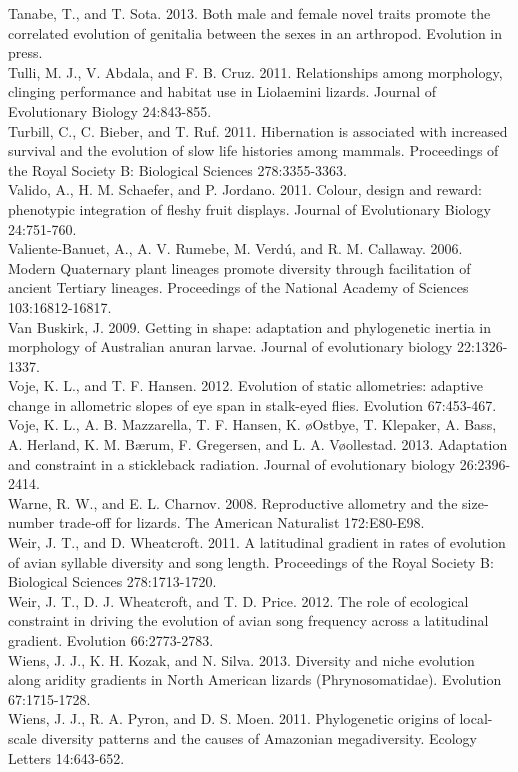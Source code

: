 Tanabe, T., and T. Sota. 2013. Both male and female novel traits promote the correlated evolution of genitalia between the sexes in an arthropod. Evolution in press.\\
Tulli, M. J., V. Abdala, and F. B. Cruz. 2011. Relationships among morphology, clinging performance and habitat use in Liolaemini lizards. Journal of Evolutionary Biology 24:843-855.\\
Turbill, C., C. Bieber, and T. Ruf. 2011. Hibernation is associated with increased survival and the evolution of slow life histories among mammals. Proceedings of the Royal Society B: Biological Sciences 278:3355-3363.\\
Valido, A., H. M. Schaefer, and P. Jordano. 2011. Colour, design and reward: phenotypic integration of fleshy fruit displays. Journal of Evolutionary Biology 24:751-760.\\
Valiente-Banuet, A., A. V. Rumebe, M. Verdú, and R. M. Callaway. 2006. Modern Quaternary plant lineages promote diversity through facilitation of ancient Tertiary lineages. Proceedings of the National Academy of Sciences 103:16812-16817.\\
Van Buskirk, J. 2009. Getting in shape: adaptation and phylogenetic inertia in morphology of Australian anuran larvae. Journal of evolutionary biology 22:1326-1337.\\
Voje, K. L., and T. F. Hansen. 2012. Evolution of static allometries: adaptive change in allometric slopes of eye span in stalk-eyed flies. Evolution 67:453-467.\\
Voje, K. L., A. B. Mazzarella, T. F. Hansen, K. \o{O}stbye, T. Klepaker, A. Bass, A. Herland, K. M. Bærum, F. Gregersen, and L. A. V\o{o}llestad. 2013. Adaptation and constraint in a stickleback radiation. Journal of evolutionary biology 26:2396-2414.\\
Warne, R. W., and E. L. Charnov. 2008. Reproductive allometry and the size‐number trade‐off for lizards. The American Naturalist 172:E80-E98.\\
Weir, J. T., and D. Wheatcroft. 2011. A latitudinal gradient in rates of evolution of avian syllable diversity and song length. Proceedings of the Royal Society B: Biological Sciences 278:1713-1720.\\
Weir, J. T., D. J. Wheatcroft, and T. D. Price. 2012. The role of ecological constraint in driving the evolution of avian song frequency across a latitudinal gradient. Evolution 66:2773-2783.\\
Wiens, J. J., K. H. Kozak, and N. Silva. 2013. Diversity and niche evolution along aridity gradients in North American lizards (Phrynosomatidae). Evolution 67:1715-1728.\\
Wiens, J. J., R. A. Pyron, and D. S. Moen. 2011. Phylogenetic origins of local-scale diversity patterns and the causes of Amazonian megadiversity. Ecology Letters 14:643-652.